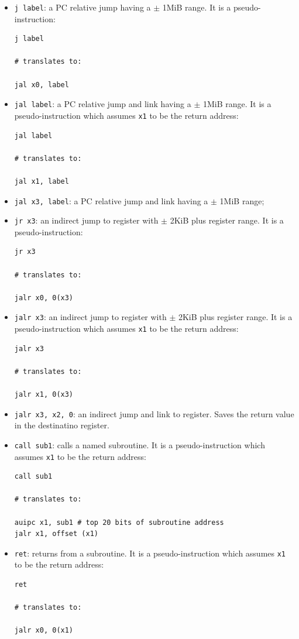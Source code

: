 \documentclass[a4paper,11pt]{article}
\begin{document}
\begin{itemize}
	\item \lstinline|j label|: a PC relative jump having a $\pm$ 1MiB range. It is a pseudo-instruction:
	      \begin{lstlisting}[style=codestyle]	
j label

# translates to:

jal x0, label
\end{lstlisting}
	\item \lstinline|jal label|: a PC relative jump and link having a $\pm$ 1MiB range. It is a pseudo-instruction which assumes \texttt{x1} to be the return address:
	      \begin{lstlisting}[style=codestyle]	
jal label

# translates to:

jal x1, label
\end{lstlisting}
	\item \lstinline|jal x3, label|: a PC relative jump and link having a $\pm$ 1MiB range;
	\item \lstinline|jr x3|: an indirect jump to register with $\pm$ 2KiB plus register range. It is a pseudo-instruction:
	      \begin{lstlisting}[style=codestyle]	
jr x3 

# translates to:

jalr x0, 0(x3) 
\end{lstlisting}
	\item \lstinline|jalr x3|: an indirect jump to register with $\pm$ 2KiB plus register range. It is a pseudo-instruction which assumes \texttt{x1} to be the return address:
	      \begin{lstlisting}[style=codestyle]	
jalr x3 

# translates to:

jalr x1, 0(x3) 
\end{lstlisting}
	\item \lstinline|jalr x3, x2, 0|: an indirect jump and link to register. Saves the return value in the destinatino register.
	\item \lstinline|call sub1|: calls a named subroutine. It is a pseudo-instruction which assumes \texttt{x1} to be the return address:
	      \begin{lstlisting}[style=codestyle]	
call sub1

# translates to:

auipc x1, sub1 # top 20 bits of subroutine address
jalr x1, offset (x1)
\end{lstlisting}
	\item \lstinline|ret|: returns from a subroutine. It is a pseudo-instruction which assumes \texttt{x1} to be the return address:
	      \begin{lstlisting}[style=codestyle]	
ret

# translates to:

jalr x0, 0(x1)
\end{lstlisting}
\end{itemize}
\end{document}

